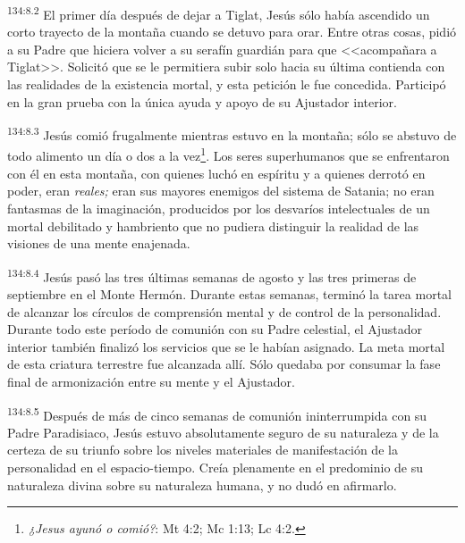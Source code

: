 \par 
\textsuperscript{134:8.2} El primer día después de dejar a Tiglat, Jesús sólo había ascendido un corto trayecto de la montaña cuando se detuvo para orar. Entre otras cosas, pidió a su Padre que hiciera volver a su serafín guardián para que <<acompañara a Tiglat>>. Solicitó que se le permitiera subir solo hacia su última contienda con las realidades de la existencia mortal, y esta petición le fue concedida. Participó en la gran prueba con la única ayuda y apoyo de su Ajustador interior.

\par 
\textsuperscript{134:8.3} Jesús comió frugalmente mientras estuvo en la montaña; sólo se abstuvo de todo alimento un día o dos a la vez\footnote{\textit{¿Jesus ayunó o comió?}: Mt 4:2; Mc 1:13; Lc 4:2.}. Los seres superhumanos que se enfrentaron con él en esta montaña, con quienes luchó en espíritu y a quienes derrotó en poder, eran \textit{reales;} eran sus mayores enemigos del sistema de Satania; no eran fantasmas de la imaginación, producidos por los desvaríos intelectuales de un mortal debilitado y hambriento que no pudiera distinguir la realidad de las visiones de una mente enajenada.

\par 
\textsuperscript{134:8.4} Jesús pasó las tres últimas semanas de agosto y las tres primeras de septiembre en el Monte Hermón. Durante estas semanas, terminó la tarea mortal de alcanzar los círculos de comprensión mental y de control de la personalidad. Durante todo este período de comunión con su Padre celestial, el Ajustador interior también finalizó los servicios que se le habían asignado. La meta mortal de esta criatura terrestre fue alcanzada allí. Sólo quedaba por consumar la fase final de armonización entre su mente y el Ajustador.

\par 
\textsuperscript{134:8.5} Después de más de cinco semanas de comunión ininterrumpida con su Padre Paradisiaco, Jesús estuvo absolutamente seguro de su naturaleza y de la certeza de su triunfo sobre los niveles materiales de manifestación de la personalidad en el espacio-tiempo. Creía plenamente en el predominio de su naturaleza divina sobre su naturaleza humana, y no dudó en afirmarlo.

